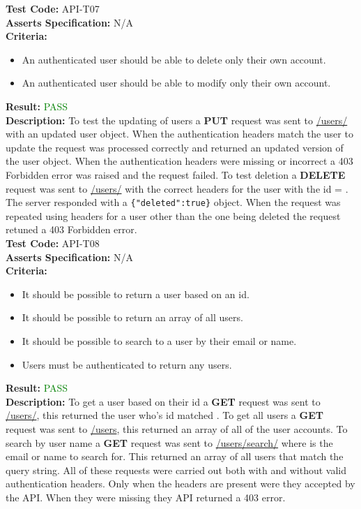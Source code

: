 \documentclass[11pt,a4paper]{report}
\begin{document}
\label{test:API-T07}
\noindent\textbf{Test Code:} API-T07\\
\textbf{Asserts Specification:} N/A \\ 
\textbf{Criteria:} \begin{itemize}
                     \item An authenticated user should be able to delete only their own account.
                     \item An authenticated user should be able to modify only their own account. 
                   \end{itemize}  
\textbf{Result:} \textcolor{green}{PASS}\\ 
\textbf{Description:} To test the updating of users a \textbf{PUT} request was sent to \url{/users/} with an updated user object. When the authentication headers match the user to update the request was processed correctly and returned an updated version of the user object. When the authentication headers were missing or incorrect a 403 Forbidden error was raised and the request failed. To test deletion a \textbf{DELETE} request was sent to \url{/users/} with the correct headers for the user with the id = . The server responded with a \lstinline${"deleted":true}$ object. When the request was repeated using headers for a user other than the one being deleted the request retuned a 403 Forbidden error. \\

\label{test:API-T08}
\noindent\textbf{Test Code:} API-T08\\
\textbf{Asserts Specification:} N/A \\ 
\textbf{Criteria:} \begin{itemize}
                     \item It should be possible to return a user based on an id.
                     \item It should be possible to return an array of all users.
                     \item It should be possible to search to a user by their email or name.
                     \item Users must be authenticated to return any users. 
                   \end{itemize}  
\textbf{Result:} \textcolor{green}{PASS}\\ 
\textbf{Description:} To get a user based on their id a \textbf{GET} request was sent to \url{/users/}, this returned the user who's id matched . To get all users a \textbf{GET} request was sent to \url{/users}, this returned an array of all of the user accounts. To search by user name a \textbf{GET} request was sent to \url{/users/search/} where  is the email or name to search for. This returned an array of all users that match the query string. All of these requests were carried out both with and without valid authentication headers. Only when the headers are present were they accepted by the API. When they were missing they API returned a 403 error. \\
\end{document}
